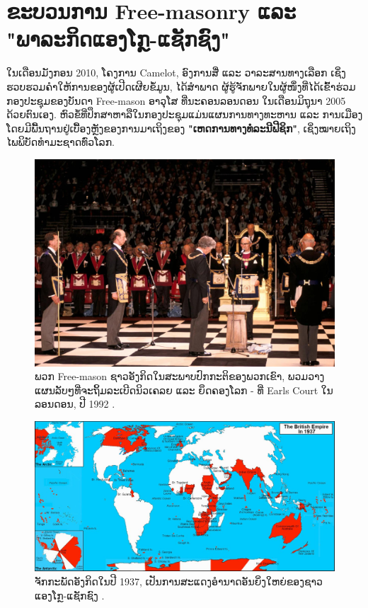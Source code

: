 \documentclass[10pt,twocolumn,letterpaper]{article}
\begin{document}
\section{ຂະບວນການ Free-masonry ແລະ "ພາລະກິດແອງໂກຼ-ແຊັກຊົງ"}

ໃນເດືອນມັງກອນ 2010, ໂຄງການ Camelot, ອົງການສື່ ແລະ ວາລະສານທາງເລືອກ ເຊິ່ງຮວບຮວມຄໍາໃຫ້ການຂອງຜູ້ເປີດເຜີຍຂໍ້ມູນ, ໄດ້ສໍາພາດ \cite{4,6} ຜູ້ຮູ້ຈັກພາຍໃນຜູ້ໜຶ່ງທີ່ໄດ້ເຂົ້າຮ່ວມກອງປະຊຸມຂອງບັນດາ Free-mason ອາວຸໂສ ທີ່ນະຄອນລອນດອນ ໃນເດືອນມິຖຸນາ 2005 ດ້ວຍຕົນເອງ. ຫົວຂໍ້ທີ່ປຶກສາຫາລືໃນກອງປະຊຸມແມ່ນແຜນການທາງທະຫານ ແລະ ການເມືອງ ໂດຍມີພື້ນຖານຢູ່ເບື້ອງຫຼັງຂອງການມາເຖິງຂອງ \textbf{"ເຫດການທາງທໍລະນີຟີຊິກ"}, ເຊິ່ງໝາຍເຖິງໄພພິບັດທຳມະຊາດທົ່ວໂລກ.

\begin{figure}[b]
\begin{center}
   \includegraphics[width=1\linewidth]{freemason.jpg}
\end{center}
   \caption{ພວກ Free-mason ຊາວອັງກິດໃນສະພາບປົກກະຕິຂອງພວກເຂົາ, ພວມວາງແຜນລັບໆທີ່ຈະຖິ້ມລະເບີດນິວເຄລຍ ແລະ ຍຶດຄອງໂລກ - ທີ່ Earls Court ໃນລອນດອນ, ປີ 1992 \cite{5}.}
\label{fig:1}
\label{fig:onecol}
\end{figure}

\begin{figure}[t]
\begin{center}
\includegraphics[width=1\textwidth]{british.jpg}
\end{center}
   \caption{ຈັກກະພັດອັງກິດໃນປີ 1937, ເປັນການສະແດງອຳນາດອັນຍິ່ງໃຫຍ່ຂອງຊາວແອງໂກຼ-ແຊັກຊົງ \cite{14}.}
   \label{fig:2}
\end{figure}
\end{document}
